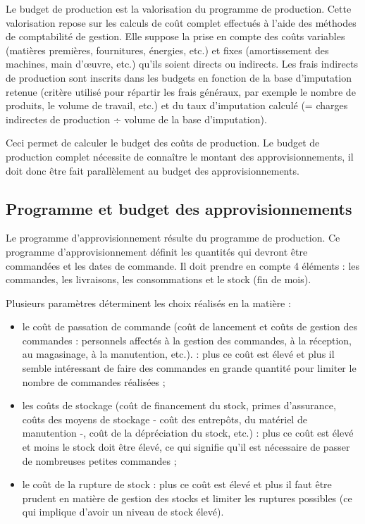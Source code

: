\documentclass[oneside]{kaobook}
\begin{document}
Le budget de production est la valorisation du programme de production. Cette valorisation repose sur les calculs de coût complet effectués à l'aide des méthodes de comptabilité de gestion. Elle suppose la prise en compte des coûts variables (matières premières, fournitures, énergies, etc.) et fixes (amortissement des machines, main d'œuvre, etc.) qu'ils soient directs ou indirects. Les frais indirects de production sont inscrits dans les budgets en fonction de la base d'imputation retenue (critère utilisé pour répartir les frais généraux, par exemple le nombre de produits, le volume de travail, etc.) et du taux d'imputation calculé (= charges indirectes de production ÷ volume de la base d'imputation).

Ceci permet de calculer le budget des coûts de production. Le budget de production complet nécessite de connaître le montant des approvisionnements, il doit donc être fait parallèlement au budget des approvisionnements.

\subsection{Programme et budget des approvisionnements}
\label{sec:orgac386ec}

Le programme d'approvisionnement résulte du programme de production. Ce programme d'approvisionnement définit les quantités qui devront être commandées et les dates de commande. Il doit prendre en compte 4 éléments : les commandes, les livraisons, les consommations et le stock (fin de mois).

Plusieurs paramètres déterminent les choix réalisés en la matière :
\begin{itemize}
\item le coût de passation de commande (coût de lancement et coûts de gestion des commandes : personnels affectés à la gestion des commandes, à la réception, au magasinage, à la manutention, etc.). : plus ce coût est élevé et plus il semble intéressant de faire des commandes en grande quantité pour limiter le nombre de commandes réalisées ;
\item les coûts de stockage (coût de financement du stock, primes d'assurance, coûts des moyens de stockage - coût des entrepôts, du matériel de manutention -, coût de la dépréciation du stock, etc.) : plus ce coût est élevé et moins le stock doit être élevé, ce qui signifie qu'il est nécessaire de passer de nombreuses petites commandes ;
\item le coût de la rupture de stock : plus ce coût est élevé et plus il faut être prudent en matière de gestion des stocks et limiter les ruptures possibles (ce qui implique d'avoir un niveau de stock élevé).
\end{itemize}
\end{document}
